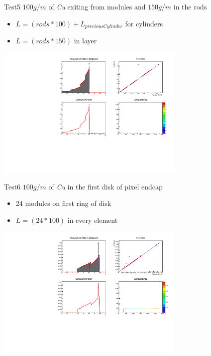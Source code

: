 \documentclass[pdftex, 11pt]{beamer}
\begin{document}
\begin{frame}
  \begin{block}{Test5}
    \alert{$100 g/m$} of \emph{Cu} exiting from modules and \alert{$150 g/m$} in the rods
    \begin{itemize}
    \item \alert{$L=(rods*100) + L_{previousCylinder}$} for cylinders
    \item \alert{$L=(rods*150)$} in layer
    \end{itemize}
  \end{block}
  \begin{center}
    \includegraphics[width=9cm]{img/test5.pdf}
  \end{center}
\end{frame}

\begin{frame}
  \begin{block}{Test6}
    \alert{$100 g/m$} of \emph{Cu} in the first disk of pixel endcap
    \begin{itemize}
    \item \alert{$24$} modules on first ring of disk
    \item \alert{$L=(24*100)$} in every element
    \end{itemize}
  \end{block}
  \begin{center}
    \includegraphics[width=9cm]{img/test6.pdf}
  \end{center}
\end{frame}
\end{document}
